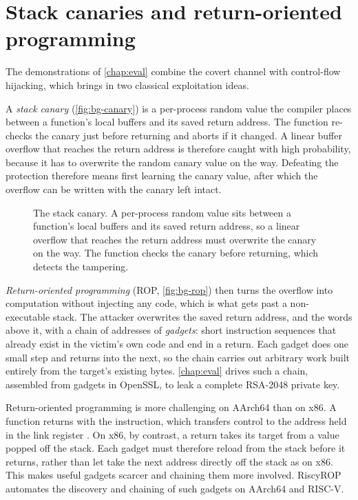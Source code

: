 \section{Stack canaries and return-oriented programming}
\label{sec:bg-exploitation}

The demonstrations of \autoref{chap:eval} combine the covert channel with control-flow hijacking,
which brings in two classical exploitation ideas.

A \emph{stack canary} (\autoref{fig:bg-canary}) is a per-process random value the compiler places
between a function's local
buffers and its saved return address. The function re-checks the canary just before returning and
aborts if it changed. A linear buffer overflow that reaches the return address is therefore caught
with high probability, because it has to overwrite the random canary value on the way. Defeating the protection therefore means first learning
the canary value, after which the overflow can be written with the canary left intact.

\begin{figure}[h]
\centering
\fitwidth{}
\caption{The stack canary. A per-process random value sits between a function's local buffers and
its saved return address, so a linear overflow that reaches the return address must overwrite the
canary on the way. The function checks the canary before returning, which detects the tampering.}
\label{fig:bg-canary}
\end{figure}

\emph{Return-oriented programming} (ROP, \autoref{fig:bg-rop}) then turns the overflow into computation without injecting
any code, which is what gets past a non-executable stack. The attacker overwrites the saved return
address, and the words above it, with a chain of addresses of \emph{gadgets}: short instruction
sequences that already exist in the victim's own code and end in a return. Each gadget does one small
step and returns into the next, so the chain carries out arbitrary work built entirely from the
target's existing bytes. \autoref{chap:eval} drives such a chain, assembled from gadgets in OpenSSL,
to leak a complete RSA-2048 private key.

Return-oriented programming is more challenging on AArch64 than on x86. A function returns with the
 instruction, which transfers control to the address held in the link register .
On x86, by contrast, a return takes its target from a value popped off the stack. Each gadget must therefore reload  from the stack
before it returns, rather than let  take the next address directly off the stack as on x86.
This makes useful gadgets scarcer and chaining them more involved. RiscyROP~\cite{riscyrop} automates the
discovery and chaining of such gadgets on AArch64 and RISC-V.

